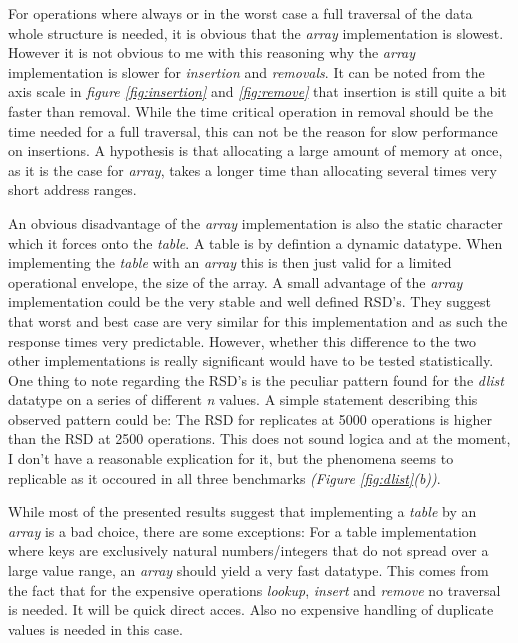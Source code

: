 \documentclass[a4paper,11pt,twoside]{article}
\begin{document}
For operations where always or in the worst case a full
traversal of the data whole structure is needed, it is obvious that the
\emph{array} implementation is slowest. However it is not obvious to me with this
reasoning why the \emph{array} implementation is slower for \emph{insertion} and
\emph{removals}. It can be noted from the axis scale in \textit{figure
  \ref{fig:insertion}} and \textit{\ref{fig:remove}} that insertion is
still quite a bit faster than removal. While the time critical
operation in removal should be the time needed for a full traversal, 
this can not be the reason for slow performance on insertions. 
A hypothesis is that allocating a large amount of memory at once, 
as it is the case for \emph{array},  takes a longer time than allocating 
several times very short address ranges. 

An obvious disadvantage of the \emph{array} implementation is also the
static character which it forces onto the \emph{table}. A table is by 
defintion a dynamic datatype. When implementing the \emph{table} with an
\emph{array} this is then just valid for a limited operational envelope,
the size of the array. A small advantage of the \emph{array} implementation 
could be the very stable and well defined RSD's. They suggest that 
worst and best case are very similar for this implementation and as 
such the response times very predictable. However, whether this difference to the two
other implementations is really significant would have to be tested
statistically. One thing to note regarding the RSD's is the peculiar
pattern found for the \emph{dlist} datatype on a series of different
\textit{n} values. A simple statement describing this observed pattern
could be: The RSD for replicates at 5000 operations is higher than the
RSD at 2500 operations. This does not sound logica and at the moment, 
I don't have a reasonable explication for it, but the phenomena seems
to replicable as it occoured in all three benchmarks 
\textit{(Figure \ref{fig:dlist}(b))}.

While most of the presented results suggest that implementing a
\emph{table} by an \emph{array} is a bad choice, there are some
exceptions: For a table implementation where keys are exclusively 
natural numbers/integers that do not spread over a large value range, 
an \emph{array} should yield a very fast datatype. This comes from the fact
that for the expensive operations \emph{lookup}, \emph{insert} and \emph{remove} no
traversal is needed. It will be quick direct acces. Also no expensive
handling of duplicate values is needed in this case.  


\end{document}
